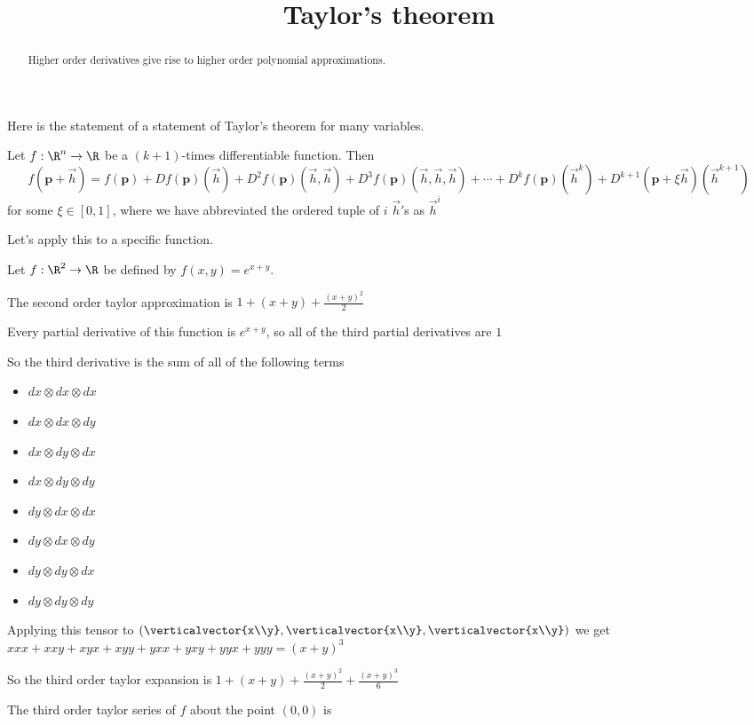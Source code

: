 \documentclass{ximera}
\title{Taylor's theorem}
\begin{document}
\begin{abstract}
	Higher order derivatives give rise to higher order polynomial approximations.
\end{abstract}

Here is the statement of a statement of Taylor's theorem for many
variables.

\begin{theorem}
	Let $f:\R^n \to \R$ be a $(k+1)$-times differentiable function.  Then
	$$f(\mathbf{p}+\vec{h}) 
	= f(\mathbf{p})+Df(\mathbf{p})(\vec{h})+D^2f(\mathbf{p})(\vec{h},\vec{h})+D^3f(\mathbf{p})(\vec{h},\vec{h},\vec{h})+ \cdots
	+D^kf(\mathbf{p})(\vec{h}^k) + D^{k+1}(\mathbf{p}+\xi\vec{h})(\vec{h}^{k+1})$$ for some $\xi \in [0,1]$,  where we have abbreviated the 
	ordered tuple of $i$ $\vec{h}'$s as $\vec{h}^i$
\end{theorem}

Let's apply this to a specific function.

\begin{question}
  Let $f:\R^2 \to \R$ be defined by $f(x,y) = e^{x+y}$.  
  \begin{solution}
    \begin{hint}
      The second order taylor approximation is $1+(x+y)+\frac{(x+y)^2}{2}$
    \end{hint}
    \begin{hint}
      Every partial derivative of this function is $e^{x+y}$, so all of the third partial derivatives are $1$
    \end{hint}
    \begin{hint}
      So the third derivative is the sum of all of the following terms 
      \begin{itemize}
      \item $dx \otimes dx \otimes dx$
      \item $dx \otimes dx \otimes dy$
      \item $dx \otimes dy \otimes dx$
      \item $dx \otimes dy \otimes dy$
      \item $dy \otimes dx \otimes dx$
      \item $dy \otimes dx \otimes dy$
      \item $dy \otimes dy \otimes dx$
      \item $dy \otimes dy \otimes dy$
      \end{itemize}
    \end{hint}
    \begin{hint}
      Applying this tensor to $(\verticalvector{x\\y},\verticalvector{x\\y},\verticalvector{x\\y})$ we get 
      $xxx+xxy+xyx+xyy+yxx+yxy+yyx+yyy = (x+y)^3$
    \end{hint}
    \begin{hint}
      So the third order taylor expansion is $1+(x+y)+\frac{(x+y)^2}{2}+\frac{(x+y)^3}{6}$
    \end{hint}
    The third order taylor series of $f$ about the point $(0,0)$ is 
  \end{solution}
\end{question}

	
	
\end{document}
